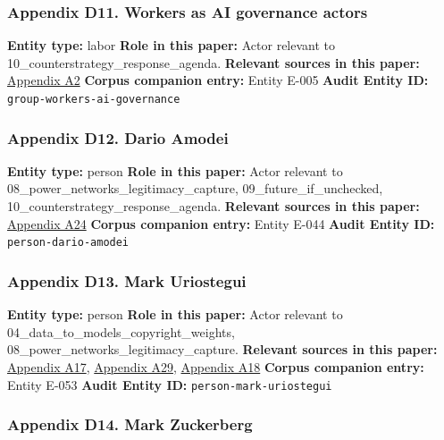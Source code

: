 \documentclass[
  american,
  11pt,
  letterpaper,
]{article}
\begin{document}
\subsubsection{Appendix D11. Workers as AI governance
actors}\label{ch-10-appendix-d11-workers-as-ai-governance-actors}

\textbf{Entity type:} labor \textbf{Role in this paper:} Actor relevant
to 10\_counterstrategy\_response\_agenda. \textbf{Relevant sources in
this paper:}
\hyperref[ch-10-appendix-a2-in-oxford-handbook-on-ai-governance-the-role-of-workers-in-ai-ethics-and-governance]{Appendix
A2} \textbf{Corpus companion entry:} Entity E-005 \textbf{Audit Entity
ID:} \texttt{group-workers-ai-governance}

\subsubsection{Appendix D12. Dario
Amodei}\label{ch-10-appendix-d12-dario-amodei}

\textbf{Entity type:} person \textbf{Role in this paper:} Actor relevant
to 08\_power\_networks\_legitimacy\_capture, 09\_future\_if\_unchecked,
10\_counterstrategy\_response\_agenda. \textbf{Relevant sources in this
paper:}
\hyperref[ch-10-appendix-a24-the-adolescence-of-technology]{Appendix
A24} \textbf{Corpus companion entry:} Entity E-044 \textbf{Audit Entity
ID:} \texttt{person-dario-amodei}

\subsubsection{Appendix D13. Mark
Uriostegui}\label{ch-10-appendix-d13-mark-uriostegui}

\textbf{Entity type:} person \textbf{Role in this paper:} Actor relevant
to 04\_data\_to\_models\_copyright\_weights,
08\_power\_networks\_legitimacy\_capture. \textbf{Relevant sources in
this paper:}
\hyperref[ch-10-appendix-a17-ai-copyright-weights-a-new-frontier-in-intellectual-property-law]{Appendix
A17},
\hyperref[ch-10-appendix-a29-how-ai-is-ruining-your-life-to-build-an-empire]{Appendix
A29},
\hyperref[ch-10-appendix-a18-bipartisan-house-task-force-report-on-artificial-intelligence]{Appendix
A18} \textbf{Corpus companion entry:} Entity E-053 \textbf{Audit Entity
ID:} \texttt{person-mark-uriostegui}

\subsubsection{Appendix D14. Mark
Zuckerberg}\label{ch-10-appendix-d14-mark-zuckerberg}
\end{document}
